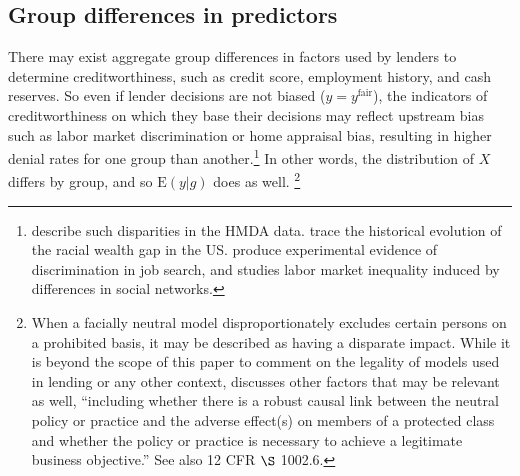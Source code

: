\subsection{Group differences in predictors}\label{sec:diffpredictors}
There may exist aggregate group differences in factors used by lenders to determine creditworthiness, such as credit score, employment history, and cash reserves. So even if lender decisions are not biased ($y=y^\text{fair}$), the indicators of creditworthiness on which they base their decisions may reflect upstream bias such as labor market discrimination or home appraisal bias, resulting in higher denial rates for one group than another.\footnote{ describe such disparities in the HMDA data.  trace the historical evolution of the racial wealth gap in the US.  produce experimental evidence of discrimination in job search, and  studies labor market inequality induced by differences in social networks.} In other words, the distribution of $X$ differs by group, and so $\text{E}\left(y\vert g\right)$ does as well. \footnote{When a facially neutral model disproportionately excludes certain persons on a prohibited basis, it may be described as having a disparate impact. While it is beyond the scope of this paper to comment on the legality of models used in lending or any other context,  discusses other factors that may be relevant as well, ``including whether there is a robust causal link between the neutral policy or practice and the adverse effect(s) on members of a protected class and whether the policy or practice is necessary to achieve a legitimate business objective.'' See also 12 CFR $\S$ 1002.6.}

